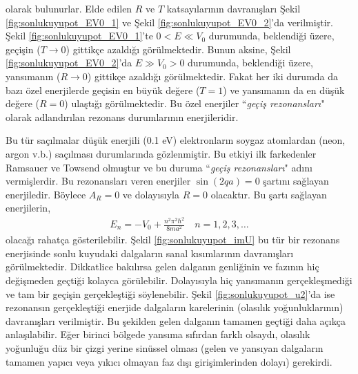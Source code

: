 \documentclass[a4paper,12pt, twoside]{article}
\begin{document}
olarak bulunurlar. Elde edilen $R$ ve $T$ katsayılarının davranışları Şekil \ref{fig:sonlukuyupot_EV0_1} ve Şekil \ref{fig:sonlukuyupot_EV0_2}'da verilmiştir. Şekil \ref{fig:sonlukuyupot_EV0_1}'te $0<E\ll V_0$ durumunda, beklendiği üzere, geçişin ($T\rightarrow0$) gittikçe azaldığı görülmektedir. Bunun aksine, Şekil \ref{fig:sonlukuyupot_EV0_2}'da $E\gg V_0>0$ durumunda, beklendiği üzere, yansımanın ($R\rightarrow0$) gittikçe azaldığı görülmektedir. Fakat her iki durumda da bazı özel enerjilerde geçisin en büyük değere ($T=1$) ve yansımanın da en düşük değere ($R=0$) ulaştığı görülmektedir. Bu özel enerjiler ``\emph{geçiş rezonansları}" olarak adlandırılan rezonans durumlarının enerjileridir. 

Bu tür saçılmalar düşük enerjili (0.1 eV) elektronların soygaz atomlardan (neon, argon v.b.) saçılması durumlarında gözlenmiştir. Bu etkiyi ilk farkedenler Ramsauer ve Towsend olmuştur \cite{book:Gasiorowicz} ve bu duruma ``\emph{geçiş rezonansları}" adını vermişlerdir. Bu rezonansları veren enerjiler $\sin(2 q a) = 0$ şartını sağlayan enerjiledir. Böylece $A_R=0$ ve dolayısıyla $R=0$ olacaktır. Bu şartı sağlayan enerjilerin,
\begin{align}
E_n=-V_{0}+\frac{n^{2} \pi^{2} \hbar^{2}}{8 m a^{2}} \quad n=1,2,3, \ldots
\end{align}
olacağı rahatça gösterilebilir. Şekil \ref{fig:sonlukuyupot_imU} bu tür bir rezonans enerjisinde sonlu kuyudaki dalgaların sanal kısımlarının davranışları görülmektedir. Dikkatlice bakılırsa gelen dalganın genliğinin ve fazının hiç değişmeden geçtiği kolayca görülebilir. Dolayısıyla hiç yansımanın gerçekleşmediği ve tam bir geçişin gerçekleştiği söylenebilir. Şekil \ref{fig:sonlukuyupot_u2}'da ise rezonansın gerçekleştiği enerjide dalgaların karelerinin (olasılık yoğunluklarının) davranışları verilmiştir. Bu şekilden gelen dalganın tamamen geçtiği daha açıkça anlaşılabilir. Eğer birinci bölgede yansıma sıfırdan farklı olsaydı, olasılık yoğunluğu düz bir çizgi yerine sinüssel olması (gelen ve yansıyan dalgaların tamamen yapıcı veya yıkıcı olmayan faz dışı girişimlerinden dolayı) gerekirdi.
\end{document}
